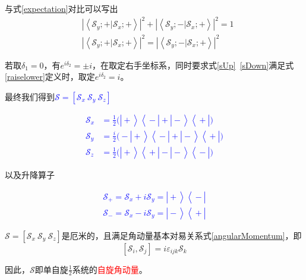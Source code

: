 \documentclass[UTF8,12pt]{article}
\providecommand\Ket[1]{\left|\right. #1 \left.\right\rangle}
\providecommand\Bra[1]{\left\langle\right. #1 \left.\right|}
\providecommand\Bracket[2]{\left\langle #1 \big| #2 \right\rangle}
\numberwithin{equation}{subsection}
\providecommand{\empB}[1]{\textcolor{blue}{#1}}
\providecommand{\empR}[1]{\textcolor{red}{#1}}
\begin{document}
	与式\ref{expectation}对比可以写出
	\begin{equation}
		\begin{aligned}
			&|\Bracket{\mathcal S_y;+}{\mathcal S_x;+}|^2+|\Bracket{\mathcal S_y;-}{\mathcal S_x;+}|^2=1\\
			&|\Bracket{\mathcal S_y;+}{\mathcal S_x;+}|^2=|\Bracket{\mathcal S_y;-}{\mathcal S_x;+}|^2
		\end{aligned}
	\end{equation}

	若取$\delta_1 = 0$，有$e^{i\delta_2}=\pm i$，在取定右手坐标系，同时要求式\ref{sUp}~\ref{sDown}满足式\ref{raiselower}定义时，取定$e^{i\delta_2}=i$。
	
	最终我们得到\empB{$\mathcal S=[\mathcal S_x~\mathcal S_y~\mathcal S_z]$}
	\begin{snugshade}
		\empB{\begin{equation}
			\begin{aligned}
				\mathcal S_x &= \frac{1}{2}\Big(\Ket{+}\Bra{-}+\Ket{-}\Bra{+}\Big)\\
				\mathcal S_y &= \frac{i}{2}\Big(-\Ket{+}\Bra{-}+\Ket{-}\Bra{+}\Big)\\
				\mathcal S_z &= \frac{1}{2}\Big(\Ket{+}\Bra{+}-\Ket{-}\Bra{-}\Big)
			\end{aligned}
			\label{spin}
		\end{equation}}
	\end{snugshade}

	以及升降算子
	
	\begin{snugshade}
		\empB{\begin{equation}
				\begin{aligned}
					\mathcal S_+=\mathcal S_x+i\mathcal S_y=\Ket{+}\Bra{-}\\
					\mathcal S_-=\mathcal S_x-i\mathcal S_y=\Ket{-}\Bra{+}
				\end{aligned}
				\label{raiselowerS}
		\end{equation}}
	\end{snugshade}
	
	$\mathcal S=[\mathcal S_x~\mathcal S_y~\mathcal S_z]$是厄米的，且满足角动量基本对易关系式\ref{angularMomentum}，即$$[\mathcal S_i,\mathcal S_j] = i\varepsilon_{ijk}\mathcal S_k$$
	
	因此，$\mathcal S$即单自旋$\frac{1}{2}$系统的\empR{自旋角动量}。
	
\end{document}
